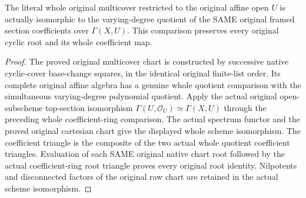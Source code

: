 \begin{lemma}
\label{lem:kn-adapted-whole-original-scheme}
\leanok
{}
The literal whole original multicover restricted to the original affine
open $U$ is actually isomorphic to the varying-degree quotient of the SAME
original framed section coefficients over $\Gamma(X,U)$. This comparison
preserves every original cyclic root and its whole coefficient map.
\end{lemma}
\begin{proof}
The proved original multicover chart is constructed by
successive native cyclic-cover base-change squares, in the identical original
finite-list order. Its complete original affine algebra has a genuine
whole quotient comparison with the simultaneous varying-degree polynomial
quotient. Apply the actual original open-subscheme top-section isomorphism
$\Gamma(U,\mathcal O_U)\simeq\Gamma(X,U)$ through the preceding whole
coefficient-ring comparison. The actual spectrum functor and the proved original cartesian chart give the displayed whole scheme isomorphism.
The coefficient triangle is the composite of the two actual whole quotient
coefficient triangles. Evaluation of each SAME original native chart root
followed by the actual coefficient-ring root triangle proves every original
root identity. Nilpotents and disconnected factors of the original raw chart
are retained in the actual scheme isomorphism.
\end{proof}

